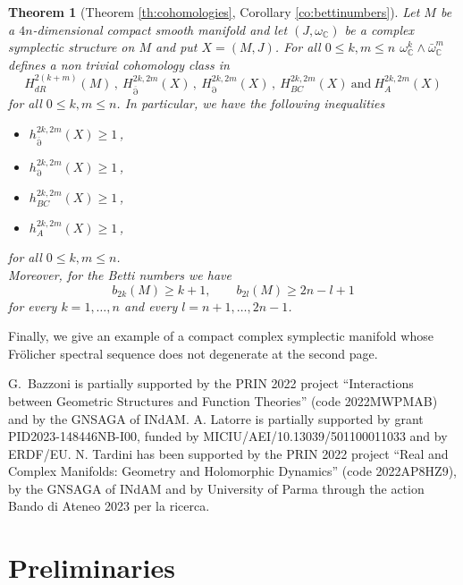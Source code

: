 \documentclass[a4paper]{amsart}
\newtheorem{theorem}{Theorem}[section]
\theoremstyle{definition}
\theoremstyle{remark}
\newcommand{\delbar}{\operatorname{\overline{\partial}}}
\newcommand{\del}{\operatorname{\partial}}
\numberwithin{equation}{section}
\begin{document}
\begin{theorem}[Theorem \ref{th:cohomologies}, Corollary \ref{co:bettinumbers}]
Let $M$ be a $4n$-dimensional compact smooth manifold and let $(J,\omega_\mathbb{C})$ be a complex symplectic structure on $M$ and put $X=(M,J)$. For all $0\leq k,m\leq n$ $\omega_\mathbb{C}^k\wedge\bar \omega_\mathbb{C}^m$ defines a non trivial cohomology class in 
\[
H^{2(k+m)}_{dR}(M)\,, \ H^{2k,2m}_{\delbar}(X)\,, \ H^{2k,2m}_{\del}(X)\,, \ H^{2k,2m}_{BC}(X) \ \mathrm{and} \ H^{2k,2m}_{A}(X) 
\]
for all $0\leq k,m\leq n$. In particular, we have the following inequalities
\begin{itemize}
\item $h^{2k,2m}_{\delbar}(X)\geq 1$\,,
\item $h^{2k,2m}_{\del}(X)\geq 1$\,,
\item $h^{2k,2m}_{BC}(X)\geq 1$\,,
\item $h^{2k,2m}_{A}(X)\geq 1$\,,
\end{itemize}
for all $0\leq k,m\leq n$.\\
Moreover, for the Betti numbers we have
\begin{equation*}
b_{2k}(M)\geq k+1,\qquad b_{2l}(M)\geq 2n-l+1
\end{equation*}
for every $k=1,\ldots, n$ and every $l=n+1,\ldots,2n-1$.
\end{theorem}
Finally, we give an example of a compact complex symplectic manifold whose Fr\"olicher spectral sequence does not degenerate at the second page.


\medskip

 G.~Bazzoni is partially supported by the PRIN 2022 project “Interactions between Geometric Structures and Function Theories” (code 2022MWPMAB) and by the GNSAGA of INdAM. A. Latorre is partially
supported by grant PID2023-148446NB-I00, funded by
MICIU/AEI/10.13039/501100011033 and by ERDF/EU. N. Tardini has been supported by the PRIN 2022 project “Real and Complex Manifolds: Geometry and Holomorphic Dynamics” (code 2022AP8HZ9), by the GNSAGA of INdAM and by University of Parma through the action Bando di Ateneo 2023 per la ricerca.

\section{Preliminaries}\label{preliminaries}
\end{document}

